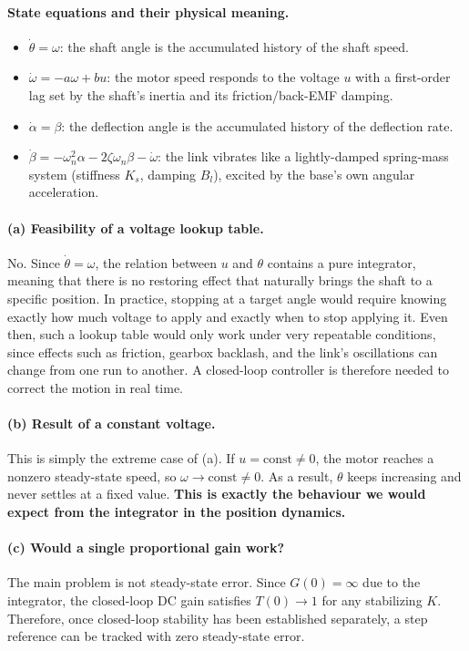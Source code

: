 \documentclass[a4paper,11pt]{article}
\begin{document}
\paragraph{State equations and their physical meaning.}
\begin{itemize}
  \item $\dot\theta = \omega$:  the shaft angle is the accumulated history of the shaft speed.
  \item $\dot\omega = -a\omega + bu$: the motor speed responds to the voltage $u$ with a
  first-order lag set by the shaft's inertia and its friction/back-EMF damping.
  \item $\dot\alpha = \beta$: the deflection angle is the accumulated history of the deflection
  rate.
  \item $\dot\beta = -\omega_n^2\alpha - 2\zeta\omega_n\beta - \dot\omega$: the link vibrates like
  a lightly-damped spring-mass system (stiffness $K_s$, damping $B_l$), excited by the base's own angular acceleration.
\end{itemize}

\paragraph{(a) Feasibility of a voltage lookup table.}
No. Since $\dot\theta=\omega$, the relation between $u$ and $\theta$ contains a pure integrator, meaning that there is no restoring effect that naturally brings the shaft to a specific position. In practice, stopping at a target angle would require knowing exactly how much voltage to apply and exactly when to stop applying it. Even then, such a lookup table would only work under very repeatable conditions, since effects such as friction, gearbox backlash, and the link's oscillations can change from one run to another. A closed-loop controller is therefore needed to correct the motion in real time.

\paragraph{(b) Result of a constant voltage.}
This is simply the extreme case of (a). If $u=\text{const}\neq0$, the motor reaches a nonzero steady-state speed, so $\omega\to\text{const}\neq0$. As a result, $\theta$ keeps increasing and never settles at a fixed value. \textbf{This is exactly the behaviour we would expect from the integrator in the position dynamics.}

\paragraph{(c) Would a single proportional gain work?}
The main problem is not steady-state error. Since $G(0)=\infty$ due to the integrator, the closed-loop DC gain satisfies $T(0)\to1$ for any stabilizing $K$. Therefore, once closed-loop stability has been established separately, a step reference can be tracked with zero steady-state error.
\end{document}
